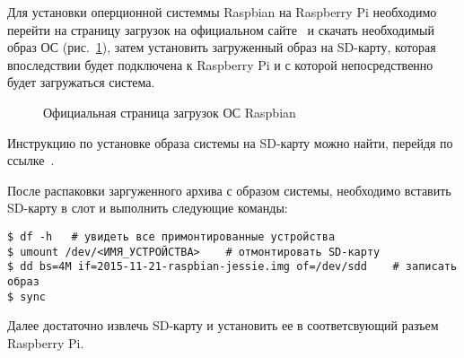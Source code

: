 Для установки оперционной системмы Raspbian на Raspberry Pi необходимо перейти на страницу загрузок на официальном сайте~\cite{raspbian_downloads} и скачать необходимый образ ОС (рис.~\ref{raspbian_1:raspbian_1}), затем установить загруженный образ на SD-карту, которая впоследствии будет подключена к Raspberry Pi и с которой непосредственно будет загружаться система.

\begin{figure}[h!]
\caption{ Официальная страница загрузок ОС Raspbian }
\label{raspbian_1:raspbian_1}
\end{figure}

Инструкцию по установке образа системы на SD-карту можно найти, перейдя по ссылке~\cite{raspbian_install}. 

После распаковки заргуженного архива с образом системы, необходимо вставить SD-карту в слот и выполнить следующие команды:

\begin{verbatim}
$ df -h   # увидеть все примонтированные устройства 
$ umount /dev/<ИМЯ_УСТРОЙСТВА>    # отмонтировать SD-карту
$ dd bs=4M if=2015-11-21-raspbian-jessie.img of=/dev/sdd    # записать образ
$ sync
\end{verbatim}

Далее достаточно извлечь SD-карту и установить ее в соответсвующий разъем Raspberry Pi.

\clearpage
